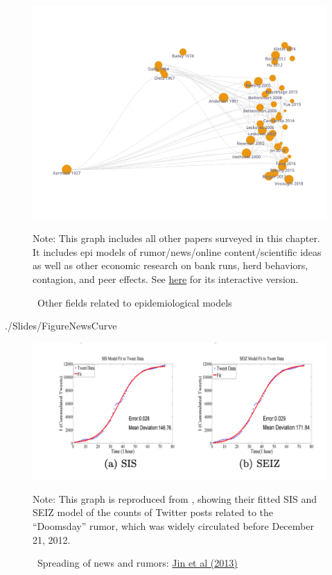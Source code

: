 \begin{figure}[!ht] \centering  %
	\caption{ ~Other fields related to epidemiological models}
	\label{fig:graph_other}
	\centerline{\includegraphics[width=\textwidth]{./figures/graph_other}}
				\begin{flushleft}{\footnotesize Note: This graph includes all other papers surveyed in this chapter. It includes epi models of rumor/news/online content/scientific ideas as well as other economic research on bank runs, herd behaviors, contagion, and peer effects. See \href{https://app.litmaps.co/shared/B5FA1F14-01A8-4C9D-BF23-BE0F62293FAF}{here} for its interactive version.}
						\end{flushleft}
\end{figure}


\newpage


\begin{verbatimwrite}{./Slides/FigureNewsCurve}
\begin{figure}[!ht] \centering  %
	\caption{ ~Spreading of news and rumors: \href{https://people.cs.vt.edu/ramakris/papers/news-rumor-epi-snakdd13.pdf}{Jin et al (2013)}}\nocite{jin2013epidemiological}
	\label{fig:news_curve}
	\centerline{\includegraphics[width=\textwidth]{./figures/Doomsday}}
		\begin{flushleft}{\footnotesize Note: This graph is reproduced from \cite{jin2013epidemiological}, showing their fitted SIS and SEIZ model of the counts of Twitter posts related to the ``Doomsday'' rumor, which was widely circulated before December 21, 2012.}
	\end{flushleft}
\end{figure}
\end{verbatimwrite}%


